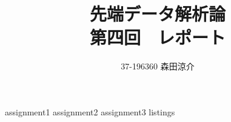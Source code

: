 \documentclass[dvipdfmx, fleqn, titlepage]{jsarticle}
\title{
	先端データ解析論 \\
	第四回　レポート
	}
\author{37-196360 \quad 森田涼介}
\begin{document}
\maketitle

{assignment1}
{assignment2}
{assignment3}
\newpage
{listings}
\end{document}
